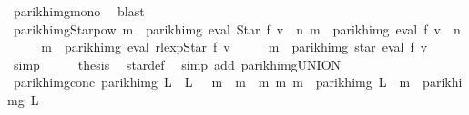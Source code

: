 \begin{isabellebody}
\isamarkupfalse%
\ parikh{\isacharunderscore}{\kern0pt}img{\isacharunderscore}{\kern0pt}mono\ \isamarkupfalse%
\ blast%
\endisatagproof
{\isafoldproof}%
%
\isadelimproof
\isanewline
%
\endisadelimproof
\isanewline
\isanewline
{}\isamarkupfalse%
\ parikh{\isacharunderscore}{\kern0pt}img{\isacharunderscore}{\kern0pt}Star{\isacharunderscore}{\kern0pt}pow{\isacharcolon}{\kern0pt}\ {\isachardoublequoteopen}m\ {\isasymin}\ parikh{\isacharunderscore}{\kern0pt}img\ {\isacharparenleft}{\kern0pt}eval\ {\isacharparenleft}{\kern0pt}Star\ f{\isacharparenright}{\kern0pt}\ v{\isacharparenright}{\kern0pt}\ {\isasymLongrightarrow}\ {\isasymexists}n{\isachardot}{\kern0pt}\ m\ {\isasymin}\ parikh{\isacharunderscore}{\kern0pt}img\ {\isacharparenleft}{\kern0pt}eval\ f\ v\ {\isacharcircum}{\kern0pt}{\isacharcircum}{\kern0pt}\ n{\isacharparenright}{\kern0pt}{\isachardoublequoteclose}\isanewline
%
\isadelimproof
%
\endisadelimproof
%
\isatagproof
{}\isamarkupfalse%
\ {\isacharminus}{\kern0pt}\isanewline
\ \ \isamarkupfalse%
\ {\isachardoublequoteopen}m\ {\isasymin}\ parikh{\isacharunderscore}{\kern0pt}img\ {\isacharparenleft}{\kern0pt}eval\ {\isacharparenleft}{\kern0pt}rlexp{\isachardot}{\kern0pt}Star\ f{\isacharparenright}{\kern0pt}\ v{\isacharparenright}{\kern0pt}{\isachardoublequoteclose}\isanewline
\ \ \isamarkupfalse%
\ \isamarkupfalse%
\ {\isachardoublequoteopen}m\ {\isasymin}\ parikh{\isacharunderscore}{\kern0pt}img\ {\isacharparenleft}{\kern0pt}star\ {\isacharparenleft}{\kern0pt}eval\ f\ v{\isacharparenright}{\kern0pt}{\isacharparenright}{\kern0pt}{\isachardoublequoteclose}\ \isamarkupfalse%
\ simp\isanewline
\ \ \isamarkupfalse%
\ \isamarkupfalse%
\ {\isacharquery}{\kern0pt}thesis\ \isamarkupfalse%
\ star{\isacharunderscore}{\kern0pt}def\ \isamarkupfalse%
\ {\isacharparenleft}{\kern0pt}simp\ add{\isacharcolon}{\kern0pt}\ parikh{\isacharunderscore}{\kern0pt}img{\isacharunderscore}{\kern0pt}UNION{\isacharparenright}{\kern0pt}\isanewline
{}\isamarkupfalse%
%
\endisatagproof
{\isafoldproof}%
%
\isadelimproof
\isanewline
%
\endisadelimproof
\isanewline
\isanewline
{}\isamarkupfalse%
\ parikh{\isacharunderscore}{\kern0pt}img{\isacharunderscore}{\kern0pt}conc{\isacharcolon}{\kern0pt}\ {\isachardoublequoteopen}parikh{\isacharunderscore}{\kern0pt}img\ {\isacharparenleft}{\kern0pt}L{}\ {\isacharat}{\kern0pt}{\isacharat}{\kern0pt}\ L{}{\isacharparenright}{\kern0pt}\ {\isacharequal}{\kern0pt}\ {\isacharbraceleft}{\kern0pt}\ m{}\ {\isacharplus}{\kern0pt}\ m{}\ {\isacharbar}{\kern0pt}\ m{}\ m{}{\isachardot}{\kern0pt}\ m{}\ {\isasymin}\ parikh{\isacharunderscore}{\kern0pt}img\ L{}\ {\isasymand}\ m{}\ {\isasymin}\ parikh{\isacharunderscore}{\kern0pt}img\ L{}\ {\isacharbraceright}{\kern0pt}{\isachardoublequoteclose}\isanewline

\end{isabellebody}
